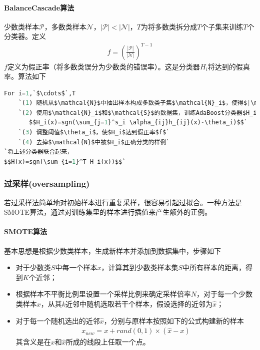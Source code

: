 \paragraph{BalanceCascade算法}
少数类样本$\mathcal{P}$，多数类样本$\mathcal{N}$，$|\mathcal{P}|<|\mathcal{N}|$，$T$为将多数类拆分成$T$个子集来训练$T$个分类器。定义
\begin{eqnarray}
f = \left( \frac{|\mathcal{P}|}{\mathcal{|N|}} \right)^{T-1}
\end{eqnarray}
$f$定义为假正率（将多数类误分为少数类的错误率）。这是分类器$H_i$将达到的假真率。算法如下
\begin{lstlisting}[language=python]
For i=1,`$\cdots$`,T
    `(1) 随机从$\mathcal{N}$中抽出样本构成多数类子集$\mathcal{N}_i$，使得$|\mathcal{N}_i|=|\mathcal{S}|$`
    `(2) 使用$\mathcal{N}_i$和$\mathcal{S}$的数据集，训练AdaBoost分类器$H_i$，其中$h_{ij}(x)$为弱分类器，训练$s_i$次，得到对应的权重$\alpha_{ij}$和阈值$\theta_i$，
       $$H_i(x)=sgn(\sum_{j=1}^s_i \alpha_{ij}h_{ij}(x)-\theta_i)$$`
    `(3) 调整阈值$\theta_i$，使$H_i$达到假正率$f$`
    `(4) 去掉$\mathcal{N}$中被$H_i$正确分类的样例`
`将上述分类器联合起来，
$$H(x)=sgn(\sum_{i=1}^T H_i(x))$$`
\end{lstlisting}

\subsubsection{过采样(oversampling)}
若过采样法简单地对初始样本进行重复采样，很容易引起过拟合。一种方法是SMOTE算法，通过对训练集里的样本进行插值来产生额外的正例。
\paragraph{SMOTE算法}基本思想是根据少数类样本，生成新样本并添加到数据集中，步骤如下
\begin{itemize}
\item[1] 对于少数类$S$中每一个样本$x$，计算其到少数类样本集$S$中所有样本的距离，得到$K$个近邻；
\item[2] 根据样本不平衡比例里设置一个采样比例来确定采样倍率$N$，对于每一个少数类样本$x$，从其$k$近邻中随机选取若干个样本，假设选择的近邻为$\hat{x}$；
\item[3] 对于每一个随机选出的近邻$\hat{x}$，分别与原样本按照如下的公式构建新的样本
\begin{eqnarray}
x_{new}=x + rand(0,1)\times(\hat{x}-x)
\end{eqnarray}
其含义是在$x$和$\hat{x}$所成的线段上任取一个点。
\end{itemize}

